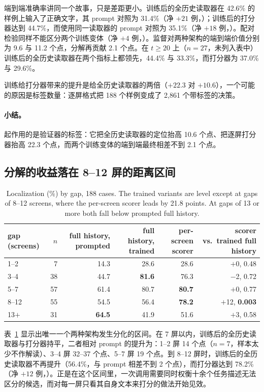 端到端准确率讲同一个故事，只是差距更小。训练后的全历史读取器在 42.6\% 的样例上输入了正确文字，其 prompt 对照为 31.4\%（净 $+21$ 例，）；训练后的打分器达到 44.7\%，而使用同一读取器的 prompt 对照为 35.1\%（净 $+18$ 例，）。配对检验同样不能区分两个训练变体（净 $+4$ 例，）。监督对两种架构的端到端价值分别为 9.6 与 11.2 个点，分解再贡献 2.1 个点。在 $t\ge20$ 上（$n=27$，未列入表中）训练后的全历史读取器在两个指标上都领先，44.4\% 与 33.3\%，而打分器为 37.0\% 与 29.6\%。

训练给打分器带来的提升是给全历史读取器的两倍（$+22.3$ 对 $+10.6$），一个可能的原因是标签数量：逐屏格式把 188 个样例变成了 2,861 个带标签的决策。

\paragraph{小结。} 起作用的是验证器的标签：它把全历史读取器的定位抬高 10.6 个点、把逐屏打分器抬高 22.3 个点，而两个训练变体的端到端最终相差不到 2.1 个点。

\subsection{分解的收益落在 8--12 屏的距离区间}
\label{sec:gap}
\begin{table}[t]
\centering\scriptsize\engfont
\caption{\rm Localization (\%) by gap, 188 cases. The trained variants are level except at gaps of 8--12 screens, where the per-screen scorer leads by 21.8 points. At gaps of 13 or more both fall below prompted full history.}
\label{tab:gap}
\begin{tabular}{lrrrrr}
\toprule
gap (screens) & $n$ & full history, prompted & full history, trained & \textbf{per-screen scorer} & scorer vs.\ trained full history \\
\midrule
1--2 & 7 & 14.3 & 28.6 & 28.6 & $+$0, 0.48 \\
3--4 & 38 & 44.7 & \textbf{81.6} & 76.3 & $-$2, 0.72 \\
5--7 & 57 & 61.4 & 80.7 & \textbf{80.7} & $+$0, 0.77 \\
8--12 & 55 & 54.5 & 56.4 & \textbf{78.2} & $+$12, \textbf{0.003} \\
13$+$ & 31 & \textbf{64.5} & 41.9 & 51.6 & $+$3, 0.58 \\
\bottomrule
\end{tabular}
\end{table}

表~\ref{tab:gap} 显示出唯一一个两种架构发生分化的区间。在 7 屏以内，训练后的全历史读取器与打分器持平，二者相对 prompt 的提升为：1--2 屏 14 个点（$n=7$，样本太少不作解读）、3--4 屏 32--37 个点、5--7 屏 19 个点。到 8--12 屏时，训练后的全历史读取器不再提升（56.4\%，与 prompt 相差不到 2 个点），而打分器达到 78.2\%（净 $+12$ 例，）。正是在这个区间里，一次调用需要同时权衡十余个任务描述无法区分的候选，而对每一屏只看其自身文本来打分的做法开始见效。

